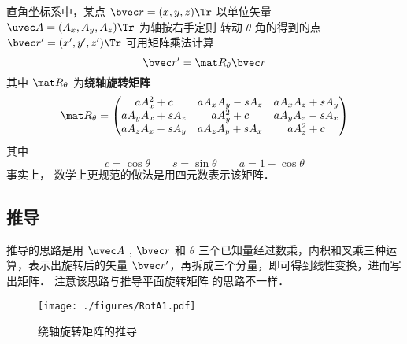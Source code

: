 

直角坐标系中，某点 $\bvec r=(x,y,z)\Tr$ 以单位矢量 $\uvec A=(A_x, A_y, A_z)\Tr$ 为轴按右手定则%
转动 $\theta$ 角的得到的点 $\bvec r'=(x',y',z')\Tr$ 可用矩阵乘法计算
\begin{equation}
\bvec r' = \mat R_\theta \bvec r
\end{equation}
其中 $\mat R_\theta$ 为\textbf{绕轴旋转矩阵}
\begin{equation}
\mat R_\theta =
\begin{pmatrix}
a A_x^2 + c & a A_x A_y - s A_z & a A_x A_z + s A_y\\
a A_y A_x + s A_z & a A_y^2 + c & a A_y A_z - s A_x\\
a A_z A_x - s A_y & a A_z A_y + s A_x & a A_z^2 + c
\end{pmatrix}\end{equation}
其中
\begin{equation}
c = \cos\theta \qquad s = \sin\theta \qquad a = 1 - \cos\theta
\end{equation}
事实上， 数学上更规范的做法是用四元数表示该矩阵．

\subsection{推导}
推导的思路是用 $\uvec A$ , $\bvec r$ 和 $\theta $ 三个已知量经过数乘，内积和叉乘三种运算，表示出旋转后的矢量 $\bvec r'$，再拆成三个分量，即可得到线性变换，进而写出矩阵． 注意该思路与推导平面旋转矩阵 的思路不一样．
\begin{figure}[ht]
\centering
\texttt{[image: ./figures/RotA1.pdf]}
\caption{绕轴旋转矩阵的推导}
\end{figure} 

